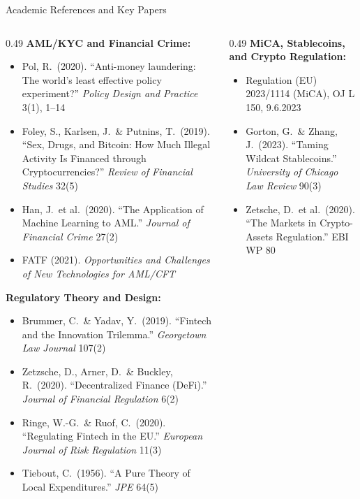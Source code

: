 \begin{frame}{Academic References and Key Papers}
  \begin{columns}[T]
    \begin{column}{0.49\textwidth}
      \textbf{AML/KYC and Financial Crime:}
      \begin{itemize}\small
        \item Pol, R.\ (2020). ``Anti-money laundering: The world's least effective policy experiment?'' \emph{Policy Design and Practice} 3(1), 1--14
        \item Foley, S., Karlsen, J.\ \& Putnins, T.\ (2019). ``Sex, Drugs, and Bitcoin: How Much Illegal Activity Is Financed through Cryptocurrencies?'' \emph{Review of Financial Studies} 32(5)
        \item Han, J.\ et al.\ (2020). ``The Application of Machine Learning to AML.'' \emph{Journal of Financial Crime} 27(2)
        \item FATF (2021). \emph{Opportunities and Challenges of New Technologies for AML/CFT}
      \end{itemize}
      \vspace{0.4em}
      \textbf{Regulatory Theory and Design:}
      \begin{itemize}\small
        \item Brummer, C.\ \& Yadav, Y.\ (2019). ``Fintech and the Innovation Trilemma.'' \emph{Georgetown Law Journal} 107(2)
        \item Zetzsche, D., Arner, D.\ \& Buckley, R.\ (2020). ``Decentralized Finance (DeFi).'' \emph{Journal of Financial Regulation} 6(2)
        \item Ringe, W.-G.\ \& Ruof, C.\ (2020). ``Regulating Fintech in the EU.'' \emph{European Journal of Risk Regulation} 11(3)
        \item Tiebout, C.\ (1956). ``A Pure Theory of Local Expenditures.'' \emph{JPE} 64(5)
      \end{itemize}
    \end{column}
    \begin{column}{0.49\textwidth}
      \textbf{MiCA, Stablecoins, and Crypto Regulation:}
      \begin{itemize}\small
        \item Regulation (EU) 2023/1114 (MiCA), OJ L 150, 9.6.2023
        \item Gorton, G.\ \& Zhang, J.\ (2023). ``Taming Wildcat Stablecoins.'' \emph{University of Chicago Law Review} 90(3)
        \item Zetsche, D.\ et al.\ (2020). ``The Markets in Crypto-Assets Regulation.'' EBI WP 80

\end{itemize}
\end{column}
\end{columns}
\end{frame}
